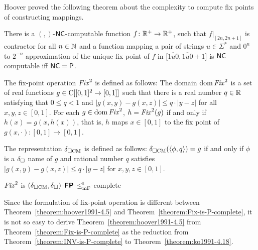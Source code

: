 \documentclass[envcountsame,orivec,oribibl]{llncs}
\begin{document}
Hoover proved the following theorem about the complexity to compute fix points
of constructing mappings.

\begin{theorem}
\label{theorem:hoover1991-4.5}
 There is a $(, )$-$\mathsf{NC}$-computable function $f \colon \mathbb R^+ \to \mathbb R^+$,
 such that $f|_{[2n, 2n+1]}$ is contractor for all $n \in \mathbb N$ and
 a function mapping a pair of strings $u \in \Sigma^*$ and $0^n$
 to $2^{-n}$ approximation of the unique fix point of $f$
 in $\bigl[ \overline{1u0}, \overline{1u0}+1 \bigr]$ is $\mathsf{NC}$ computable
 iff $\mathsf{NC} = \mathsf{P}$.
\end{theorem}

The fix-point operation $\mathit{Fix}^2$ is defined as follows:
The domain $\mathop{\rm dom} \mathit{Fix}^2$ is a set of real functions 
$g \in \mathrm C[[0,1]^2 \to [0,1]]$ such that there is a real number $q \in \mathbb R$
satisfying that $0 \le q < 1$ and $|g(x, y) - g(x, z)| \le q \cdot |y - z|$
for all $x, y, z \in [0,1]$.
For each $g \in \mathop{\rm dom} \mathit{Fix}^2$, $h = \mathit{Fix}^2(g)$ if and only if 
$h(x) = g(x, h(x))$, that is, $h$ maps $x \in [0,1]$ to the fix point of $g(x, \cdot) \colon [0,1] \to [0,1]$.

The representation $\delta _{\square \mathrm{CM}}$ is defined as follows:
$\delta _{\square \mathrm{CM}}(\langle \phi, q \rangle) = g$ if and only if
$\phi$ is a $\delta _\square$ name of $g$ and rational number $q$ satisfies 
$|g(x, y) - g(x, z)| \le q \cdot |y - z|$ for  $x, y, z \in [0,1]$.

\begin{theorem}
 \label{theorem:Fix-is-P-complete}
 $\mathit{Fix}^2$ is $(\delta _{\square \mathrm{CM}}, \delta _\square)$-$\text{\bfseries \sffamily \upshape FP}$-$\leq _{\mathrm{mF}} ^{\text{\bfseries \sffamily \upshape L}}$-complete
\end{theorem}


Since the formulation of fix-point operation is different between 
Theorem~\ref{theorem:hoover1991-4.5} and Theorem~\ref{theorem:Fix-is-P-complete},
it is not so easy to derive Theorem~\ref{theorem:hoover1991-4.5} from
Theorem~\ref{theorem:Fix-is-P-complete} as the reduction from 
Theorem~\ref{theorem:INV-is-P-complete} to Theorem~\ref{theorem:ko1991-4.18}.
\end{document}
